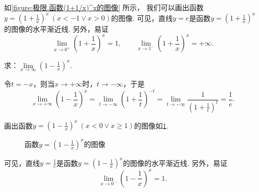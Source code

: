 如\cref{figure:极限.函数(1+1/x)^x的图像} 所示，
我们可以画出函数\(y=\left(1+\frac{1}{x}\right)^x\ (x<-1 \lor x>0)\)的图像.
可见，直线\(y=e\)是函数\(y=\left(1+\frac{1}{x}\right)^x\)的图像的水平渐近线.
另外，易证\[
\lim\limits_{x\to0^+} \left(1+\frac{1}{x}\right)^x = 1,
\qquad
\lim\limits_{x\to1^-} \left(1+\frac{1}{x}\right)^x = +\infty.
\]


\begin{example}
求：\(\lim\limits_{x \to \infty}\left(1 - \frac{1}{x}\right)^x\).
\begin{solution}
令\(t = -x\)，则当\(x \to +\infty\)时，\(t \to -\infty\)，于是\[
\lim\limits_{x \to +\infty}\left(1 - \frac{1}{x}\right)^x
= \lim\limits_{t \to -\infty}\left(1 + \frac{1}{t}\right)^{-t}
= \lim\limits_{t \to -\infty}\frac{1}{\left(1 + \frac{1}{t}\right)^t}
= \frac{1}{e}.
\]
\end{solution}

画出函数\(y=\left(1-\frac{1}{x}\right)^x\ (x<0 \lor x\geq1)\)的图像如\cref{figure:极限.函数(1-1/x)^x的图像}.
\begin{figure}[ht]
\centering
{}
\caption{函数\(y=\left(1-\tfrac{1}{x}\right)^x\)的图像}
\label{figure:极限.函数(1-1/x)^x的图像}
\end{figure}
可见，直线\(y=\frac{1}{e}\)是函数\(y=\left(1-\frac{1}{x}\right)^x\)的图像的水平渐近线.
另外，易证\[
\lim\limits_{x\to0^-} \left(1-\frac{1}{x}\right)^x = 1.
\]
\end{example}

